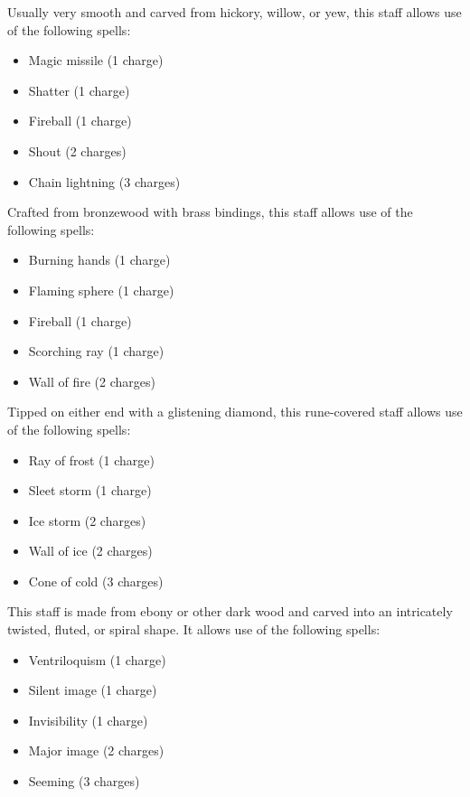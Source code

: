  Usually very smooth and carved from hickory, willow, or yew, this staff allows use of the following spells:
\begin{itemize}
\item Magic missile (1 charge)
\item Shatter (1 charge)
\item Fireball (1 charge)
\item Shout (2 charges)
\item Chain lightning (3 charges)
\end{itemize}


 Crafted from bronzewood with brass bindings, this staff allows use of the following spells:
\begin{itemize}
\item Burning hands (1 charge)
\item Flaming sphere (1 charge)
\item Fireball (1 charge)
\item Scorching ray (1 charge)
\item Wall of fire (2 charges)
\end{itemize}


 Tipped on either end with a glistening diamond, this rune-covered staff allows use of the following spells:
\begin{itemize}
\item Ray of frost (1 charge)
\item Sleet storm (1 charge)
\item Ice storm  (2 charges)
\item Wall of ice (2 charges)
\item Cone of cold (3 charges)
\end{itemize}


 This staff is made from ebony or other dark wood and carved into an intricately twisted, fluted, or spiral shape. It allows use of the following spells:
\begin{itemize}
\item Ventriloquism (1 charge)
\item Silent image (1 charge)
\item Invisibility (1 charge)
\item Major image (2 charges)
\item Seeming (3 charges)
\end{itemize}

